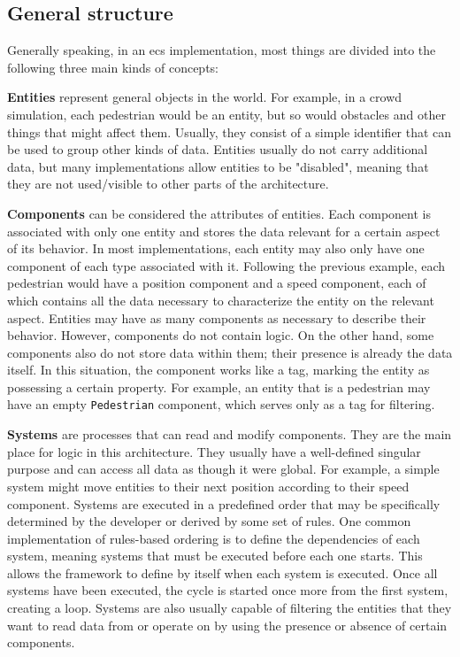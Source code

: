 \documentclass[twoside, 11pt]{article}
\begin{document}
\subsection{General structure}

Generally speaking, in an \gls{ecs} implementation, most things are divided into the following three main kinds of concepts: 

\textbf{Entities} represent general objects in the world. For example, in a crowd simulation, each pedestrian would be an entity, but so would obstacles and other things that might affect them. Usually, they consist of a simple identifier that can be used to group other kinds of data. Entities usually do not carry additional data, but many implementations allow entities to be "disabled", meaning that they are not used/visible to other parts of the architecture.


\textbf{Components} can be considered the attributes of entities. Each component is associated with only one entity and stores the data relevant for a certain aspect of its behavior. In most implementations, each entity may also only have one component of each type associated with it. Following the previous example, each pedestrian would have a position component and a speed component, each of which contains all the data necessary to characterize the entity on the relevant aspect. Entities may have as many components as necessary to describe their behavior. However, components do not contain logic. On the other hand, some components also do not store data within them; their presence is already the data itself. In this situation, the component works like a tag, marking the entity as possessing a certain property. For example, an entity that is a pedestrian may have an empty \verb|Pedestrian| component, which serves only as a tag for filtering.

\textbf{Systems} are processes that can read and modify components. They are the main place for logic in this architecture. They usually have a well-defined singular purpose and can access all data as though it were global. For example, a simple system might move entities to their next position according to their speed component. Systems are executed in a predefined order that may be specifically determined by the developer or derived by some set of rules. One common implementation of rules-based ordering is to define the dependencies of each system, meaning systems that must be executed before each one starts. This allows the framework to define by itself when each system is executed. Once all systems have been executed, the cycle is started once more from the first system, creating a loop. Systems are also usually capable of filtering the entities that they want to read data from or operate on by using the presence or absence of certain components.
\end{document}
